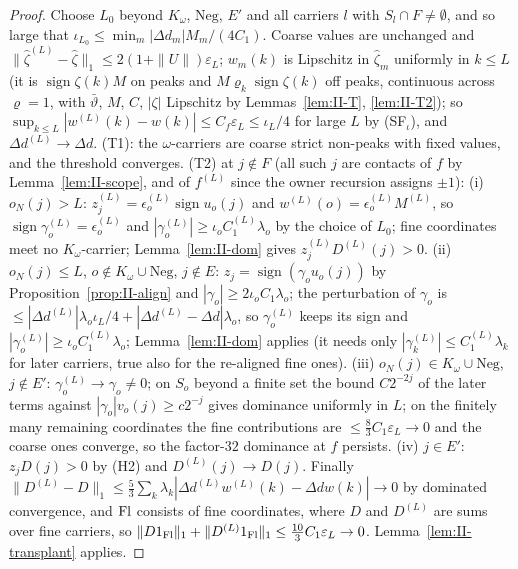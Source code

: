 \documentclass[10pt]{amsart}
\theoremstyle{definition}
\theoremstyle{remark}
\newcommand{\sgn}{\operatorname{sign}}
\begin{document}
\begin{proof}
Choose $L_0$ beyond $K_\omega$, $\mathrm{Neg}$, $E'$ and all carriers $l$ with $S_l\cap
F\ne\emptyset$, and so large that $\iota_{L_0}\le\min_m|\Delta d_m|M_m/(4C_1)$.  Coarse
values are unchanged and $\|\hat\zeta^{(L)}-\hat\zeta\|_1\le2(1+\|U\|)\varepsilon_L$;
$w_m(k)$ is Lipschitz in $\hat\zeta_m$ uniformly in $k\le L$ (it is $\sgn\zeta(k)M$ on
peaks and $M\varrho_k\sgn\zeta(k)$ off peaks, continuous across $\varrho=1$, with
$\bar\vartheta$, $M$, $C$, $|\zeta|$ Lipschitz by Lemmas~\ref{lem:II-T},
\ref{lem:II-T2}); so $\sup_{k\le L}|w^{(L)}(k)-w(k)|\le C_f\varepsilon_L\le\iota_L/4$
for large $L$ by (SF$_\iota$), and $\Delta d^{(L)}\to\Delta d$.  (T1): the
$\omega$-carriers are coarse strict non-peaks with fixed values, and the
threshold converges.  (T2) at $j\notin F$ (all such $j$ are contacts of $f$ by
Lemma~\ref{lem:II-scope}, and of $f^{(L)}$ since the owner recursion assigns
$\pm1$):
(i) $o_N(j)>L$: $z^{(L)}_j=\epsilon^{(L)}_o\sgn u_o(j)$ and $w^{(L)}(o)=\epsilon^{(L)}_oM^{(L)}$,
so $\sgn\gamma^{(L)}_o=\epsilon^{(L)}_o$ and $|\gamma^{(L)}_o|\ge\iota_oC^{(L)}_1\lambda_o$ by the
choice of $L_0$; fine coordinates meet no $K_\omega$-carrier;
Lemma~\ref{lem:II-dom} gives $z^{(L)}_jD^{(L)}(j)>0$.
(ii) $o_N(j)\le L$, $o\notin K_\omega\cup\mathrm{Neg}$, $j\notin E$: $z_j=\sgn(\gamma_o
u_o(j))$ by Proposition~\ref{prop:II-align} and $|\gamma_o|\ge2\iota_oC_1\lambda_o$; the
perturbation of $\gamma_o$ is $\le|\Delta d^{(L)}|\lambda_o\iota_L/4+|\Delta d^{(L)}-\Delta
d|\lambda_o$, so $\gamma^{(L)}_o$ keeps its sign and $|\gamma^{(L)}_o|\ge\iota_oC^{(L)}_1
\lambda_o$; Lemma~\ref{lem:II-dom} applies (it needs only $|\gamma^{(L)}_k|\le C^{(L)}_1
\lambda_k$ for later carriers, true also for the re-aligned fine ones).
(iii) $o_N(j)\in K_\omega\cup\mathrm{Neg}$, $j\notin E'$: $\gamma^{(L)}_o\to\gamma_o\ne0$; on
$S_o$ beyond a finite set the bound $C2^{-2j}$ of the later terms against
$|\gamma_o|v_o(j)\ge c2^{-j}$ gives dominance uniformly in $L$; on the finitely many
remaining coordinates the fine contributions are $\le\frac83C_1\varepsilon_L\to0$ and
the coarse ones converge, so the factor-$32$ dominance at $f$ persists.
(iv) $j\in E'$: $z_jD(j)>0$ by (H2) and $D^{(L)}(j)\to D(j)$.
Finally $\|D^{(L)}-D\|_1\le\frac53\sum_k\lambda_k|\Delta d^{(L)}w^{(L)}(k)-\Delta dw(k)|\to0$
by dominated convergence, and ${\rm Fl}$ consists of fine coordinates, where
$D$ and $D^{(L)}$ are sums over fine carriers, so $\|D1_{\rm Fl}\|_1+\|D^{(L)}
1_{\rm Fl}\|_1\le\frac{10}3C_1\varepsilon_L\to0$.  Lemma~\ref{lem:II-transplant}
applies.
\end{proof}
\end{document}
